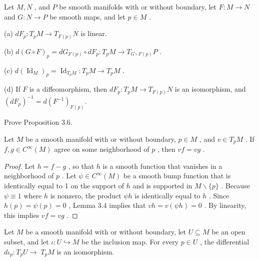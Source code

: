 \begin{proposition}
\label{prop:3-6}
\leanok
{}
Let $M, N$ , and $P$ be smooth manifolds with or without boundary, let $F : M \rightarrow  N$ and $G : N \rightarrow  P$ be smooth maps, and let $p \in  M$ .

(a) $d{F}_{p} : {T}_{p}M \rightarrow  {T}_{F\left( p\right) }N$ is linear.

(b) $d{\left( G \circ  F\right) }_{p} = d{G}_{F\left( p\right) } \circ  d{F}_{p} : {T}_{p}M \rightarrow  {T}_{G \circ  F\left( p\right) }P$ .

(c) $d{\left( {\operatorname{Id}}_{M}\right) }_{p} = {\operatorname{Id}}_{{T}_{p}M} : {T}_{p}M \rightarrow  {T}_{p}M$ .

(d) If $F$ is a diffeomorphism, then $d{F}_{p} : {T}_{p}M \rightarrow  {T}_{F\left( p\right) }N$ is an isomorphism, and ${\left( d{F}_{p}\right) }^{-1} = d{\left( {F}^{-1}\right) }_{F\left( p\right) }.$
\end{proposition}

\begin{exercise}
\label{exer:3-7}
\mathlibok
{}
Prove Proposition 3.6.
\end{exercise}

\begin{proposition}
\label{prop:3-8}
\leanok
{}
Let $M$ be a smooth manifold with or without boundary, $p \in  M$ , and $v \in  {T}_{p}M$ . If $f, g \in  {C}^{\infty }\left( M\right)$ agree on some neighborhood of $p$ , then ${vf} = {vg}$ .
\end{proposition}

\begin{proof}
\leanok
Let $h = f - g$ , so that $h$ is a smooth function that vanishes in a neighborhood of $p$ . Let $\psi  \in  {C}^{\infty }\left( M\right)$ be a smooth bump function that is identically equal to 1 on the support of $h$ and is supported in $M \smallsetminus  \{ p\}$ . Because $\psi  \equiv  1$ where $h$ is nonzero, the product ${\psi h}$ is identically equal to $h$ . Since $h\left( p\right)  = \psi \left( p\right)  = 0$ , Lemma 3.4 implies that ${vh} = v\left( {\psi h}\right)  = 0$ . By linearity, this implies ${vf} = {vg}$ .
\end{proof}

\begin{proposition}
\label{prop:3-9}
\leanok
{}
Let $M$ be a smooth manifold with or without boundary, let $U \subseteq  M$ be an open subset, and let $\iota  : U \hookrightarrow  M$ be the inclusion map. For every $p \in  U$ , the differential $d{\iota }_{p} : {T}_{p}U \rightarrow \; {T}_{p}M$ is an isomorphism.
\end{proposition}

